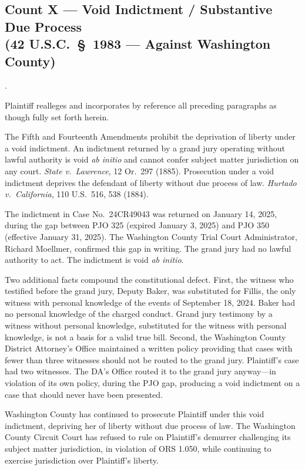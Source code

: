 \documentclass[12pt,letterpaper]{article}
\newcounter{complaintpara}
\newenvironment{paras}{%
	\begin{list}{\arabic{complaintpara}.}{%
			\setlength{\leftmargin}{0.5in}%
			\setlength{\labelwidth}{0.4in}%
			\setlength{\labelsep}{0.1in}%
			\setlength{\itemsep}{0pt}%
			\setlength{\parsep}{0pt}%
			\setlength{\topsep}{6pt}%
		}%
	}{%
	\end{list}%
}
\begin{document}
	\subsection*{Count X --- Void Indictment / Substantive Due Process\\
		(42 U.S.C.\ \S\ 1983 --- Against Washington County)}
	\begin{paras}
		
		\item Plaintiff realleges and incorporates by reference all
		preceding paragraphs as though fully set forth herein.
		
		\item The Fifth and Fourteenth Amendments prohibit the
		deprivation of liberty under a void indictment. An
		indictment returned by a grand jury operating without lawful
		authority is void \textit{ab initio} and cannot confer
		subject matter jurisdiction on any court.
		\textit{State v.\ Lawrence}, 12 Or.\ 297 (1885).
		Prosecution under a void indictment deprives the defendant
		of liberty without due process of law.
		\textit{Hurtado v.\ California}, 110 U.S.\ 516, 538 (1884).
		
		\item The indictment in Case No.\ 24CR49043 was returned on
		January 14, 2025, during the gap between PJO 325 (expired
		January 3, 2025) and PJO 350 (effective January 31, 2025).
		The Washington County Trial Court Administrator, Richard
		Moellmer, confirmed this gap in writing. The grand jury had
		no lawful authority to act. The indictment is void \textit{ab initio}.
		
		\item Two additional facts compound the constitutional defect. First, the witness who testified before the grand jury, Deputy Baker, was substituted for Fillis, the only witness with personal knowledge of the events of September 18, 2024. Baker had no personal knowledge of the charged conduct. Grand jury testimony by a witness without personal knowledge, substituted for the witness with personal knowledge, is not a basis for a valid true bill. Second, the Washington County District Attorney's Office maintained a written policy providing that cases with fewer than three witnesses should not be routed to the grand jury. Plaintiff's case had two witnesses. The DA's Office routed it to the grand jury anyway---in violation of its own policy, during the PJO gap, producing a void indictment on a case that should never have been presented.
		\item Washington County has continued to prosecute Plaintiff
		under this void indictment, depriving her of liberty without
		due process of law. The Washington County Circuit Court has
		refused to rule on Plaintiff's demurrer challenging its
		subject matter jurisdiction, in violation of ORS 1.050,
		while continuing to exercise jurisdiction over Plaintiff's
		liberty.
		

\end{paras}
\end{document}
